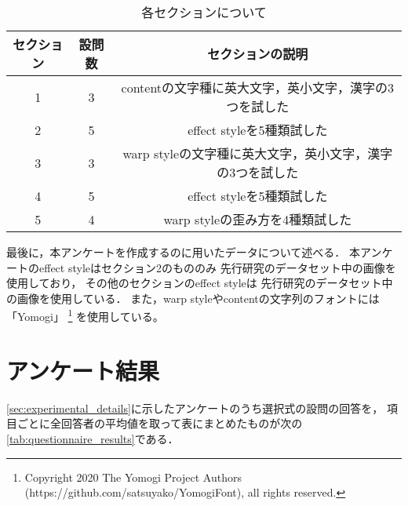 \documentclass[\homedir/main.tex]{subfiles}
\begin{document}
\begin{table}[h]
    \centering
    \caption{各セクションについて}
    \begin{tabular}[t]{ccc}
        \toprule
        セクション & 設問数 & セクションの説明                           \\
        \midrule
        1     & 3   & contentの文字種に英大文字，英小文字，漢字の3つを試した    \\
        2     & 5   & effect styleを5種類試した                \\
        3     & 3   & warp styleの文字種に英大文字，英小文字，漢字の3つを試した \\
        4     & 5   & effect styleを5種類試した                \\
        5     & 4   & warp styleの歪み方を4種類試した              \\
        \bottomrule
    \end{tabular}
    \label{tab:explanation_about_each_section}
\end{table}


最後に，本アンケートを作成するのに用いたデータについて述べる．
本アンケートのeffect styleはセクション2のもののみ
先行研究\cite{Yang2019TETGAN}のデータセット中の画像を使用しており，
その他のセクションのeffect styleは
先行研究\cite{typography2019}のデータセット中の画像を使用している．
また，warp styleやcontentの文字列のフォントには「Yomogi」
\footnote{
    Copyright 2020 The Yomogi Project Authors
    (https://github.com/satsuyako/YomogiFont), all rights reserved.
}
を使用している。
\newpage

\section{アンケート結果}\label{sec:experimental_results}
\cref{sec:experimental_details}に示したアンケートのうち選択式の設問の回答を，
項目ごとに全回答者の平均値を取って表にまとめたものが次の\cref{tab:questionnaire_results}である．
\end{document}
